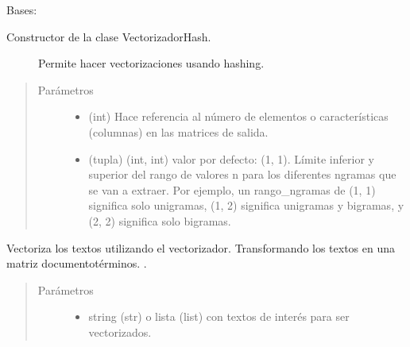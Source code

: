 \documentclass[letterpaper,10pt,openany,spanish]{sphinxmanual}
\begin{document}

\begin{fulllineitems}
\label{\detokenize{funciones/vectorizacion:vectorizacion.VectorizadorHash}}
Bases: 
\begin{description}
\item[{Constructor de la clase VectorizadorHash.  }] \leavevmode
Permite hacer vectorizaciones usando hashing.

\end{description}
\begin{quote}\begin{description}
\item[{Parámetros}] \leavevmode\begin{itemize}
\item {} 
 \textendash{} (int) Hace referencia al número de elementos o  
características (columnas) en las matrices de salida.

\item {} 
 \textendash{} (tupla) (int, int) valor por defecto: (1, 1). 
Límite inferior y superior del rango de valores n para los 
diferentes n\sphinxhyphen{}gramas que se van a extraer. Por ejemplo, 
un rango\_ngramas de (1, 1) significa solo unigramas, (1, 2) 
significa unigramas y bigramas, y (2, 2) significa solo bigramas.

\end{itemize}

\end{description}\end{quote}

\begin{fulllineitems}
\label{\detokenize{funciones/vectorizacion:vectorizacion.VectorizadorHash.transform}}
Vectoriza los textos utilizando el vectorizador. 
Transformando los textos en una matriz documento\sphinxhyphen{}términos. 
.
\begin{quote}\begin{description}
\item[{Parámetros}] \leavevmode\begin{itemize}
\item {} 
 \textendash{} string (str) o lista (list) con textos de interés 
para ser vectorizados.


\end{itemize}
\end{description}
\end{quote}
\end{fulllineitems}
\end{fulllineitems}
\end{document}
